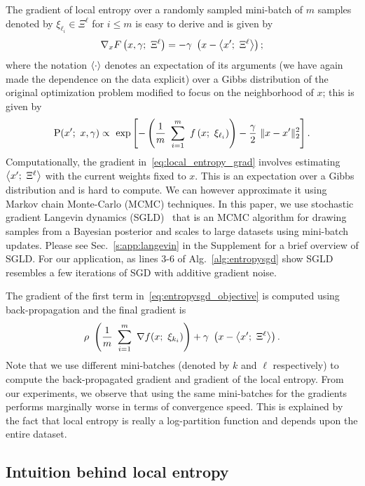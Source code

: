 \documentclass[10pt]{article}
\newcommand{\minibatch}[1]{\Xi^{#1}}
\begin{document}
The gradient of local entropy over a randomly sampled mini-batch of $m$ samples denoted by $\xi_{\ell_i} \in \minibatch{\ell}$ for $i \leq m$ is easy to derive and is given by
\begin{equation}
    \nabla_x F\rbrac{x, \g;\ \minibatch{\ell}} = -\g\ \rbrac{x - \ag{x';\ \minibatch{\ell}}};
    \label{eq:local_entropy_grad}
\end{equation}
where the notation $\left\langle\cdot\right\rangle$ denotes an expectation of its arguments (we have again made the dependence on the data explicit) over a Gibbs distribution of the original optimization problem modified to focus on the neighborhood of $x$; this is given by
\begin{equation}
    \P(x';\ x, \g) \propto\ \exp \sqbrac{-\rbrac{\f{1}{m}\ \sum_{i=1}^m\ f\rbrac{x;\ \xi_{\ell_i}}} - \f{\g}{2}\ \norm{x-x'}_2^2}.
    \label{eq:entropysgd_modified_gibbs}
\end{equation}
Computationally, the gradient in~\eqref{eq:local_entropy_grad} involves estimating $\ag{x';\ \minibatch{\ell}}$ with the current weights fixed to $x$. This is an expectation over a Gibbs distribution and is hard to compute. We can however approximate it using Markov chain Monte-Carlo (MCMC) techniques. In this paper, we use stochastic gradient Langevin dynamics (SGLD)~\citep{welling2011bayesian} that is an MCMC algorithm for drawing samples from a Bayesian posterior and scales to large datasets using mini-batch updates. Please see Sec.~\ref{s:app:langevin} in the Supplement for a brief overview of SGLD. For our application, as lines 3-6 of Alg.~\ref{alg:entropysgd} show SGLD resembles a few iterations of SGD with additive gradient noise.

The gradient of the first term in~\eqref{eq:entropysgd_objective} is computed using back-propagation and the final gradient is
\begin{equation}
    \r\ \rbrac{\f{1}{m}\ \sum_{i=1}^m\ \nabla f(x;\ \xi_{k_i})} + \g\ \rbrac{x - \ag{x';\ \minibatch{\ell}}}.
    \label{eq:entropysgd_grad}
\end{equation}
Note that we use different mini-batches (denoted by $k$ and $\ell$ respectively) to compute the back-propagated gradient and gradient of the local entropy. From our experiments, we observe that using the same mini-batches for the gradients performs marginally worse in terms of convergence speed. This is explained by the fact that local entropy is really a log-partition function and depends upon the entire dataset.

\subsection{Intuition behind local entropy}
\label{ss:intuition_local_entropy}
\end{document}

